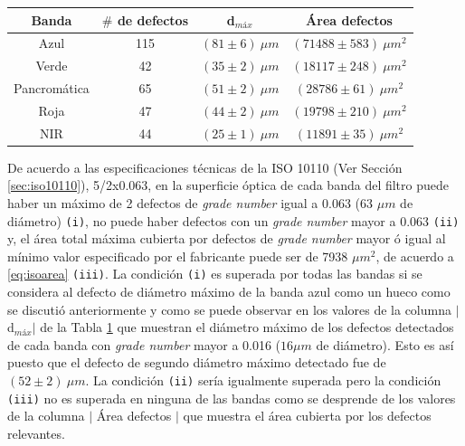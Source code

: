 \begin{table}[H]
\begin{center}
\begin{tabular}{ |c|c|c|c| }    \toprule
Banda & $\#$ de defectos & d$_{máx}$ & Área defectos\\\midrule
\rowcolor{blue!15} Azul    & 115 & $(81 \pm 6)~\mu m$ & $(71488 \pm 583)~\mu m^{2}$   \\ 
\rowcolor{green!50} Verde  & 42 &  $(35 \pm 2)~\mu m$ &  $(18117 \pm 248)~ \mu m^{2}$\\ 
Pancromática& 65 & $(51 \pm 2)~\mu m$ & $(28786 \pm 61)~\mu m^{2}$  \\
\rowcolor{red!50} Roja & 47 &  $(44 \pm 2)~\mu m$ &   $(19798 \pm 210 )~\mu m^{2}$ \\
\rowcolor{maroon!20} NIR & 44 & $(25 \pm 1)~ \mu m$  & $(11891 \pm 35 )~\mu m^{2}$ \\
\bottomrule
 \hline
\end{tabular}
\end{center}
 \label{tabISO}
\end{table}

De acuerdo a las especificaciones técnicas de la ISO 10110 (Ver Sección \ref{sec:iso10110}), 5/2x0.063,  en la superficie óptica de cada banda del filtro puede haber un máximo de 2 defectos de \textit{grade number} igual a 0.063 (63 $\mu m$ de diámetro) \texttt{(i)}, no puede haber defectos con un \textit{grade number} mayor a 0.063 \texttt{(ii)} y, el área total máxima cubierta por defectos de \textit{grade number} mayor ó igual al mínimo valor especificado por el fabricante puede ser de 7938 $\mu m^{2}$, de acuerdo a \ref{eq:isoarea} \texttt{(iii)}. La condición \texttt{(i)} es superada por todas las bandas si se considera al defecto de diámetro máximo de la banda azul como un hueco como se discutió anteriormente y como se puede observar en los valores de la columna $|$d$_{máx}$$|$ de la Tabla \ref{tabISO} que muestran el diámetro máximo de los defectos detectados de cada banda con \textit{grade number} mayor a 0.016 ($16 \mu m$ de diámetro). Esto es así puesto que el defecto de segundo diámetro máximo detectado fue de $(52 \pm 2)~ \mu m$. La condición \texttt{(ii)} sería igualmente superada pero la condición \texttt{(iii)} no es superada en ninguna de las bandas como se desprende de los valores de la columna $|$ Área defectos $|$  que muestra el área cubierta por los defectos relevantes.

